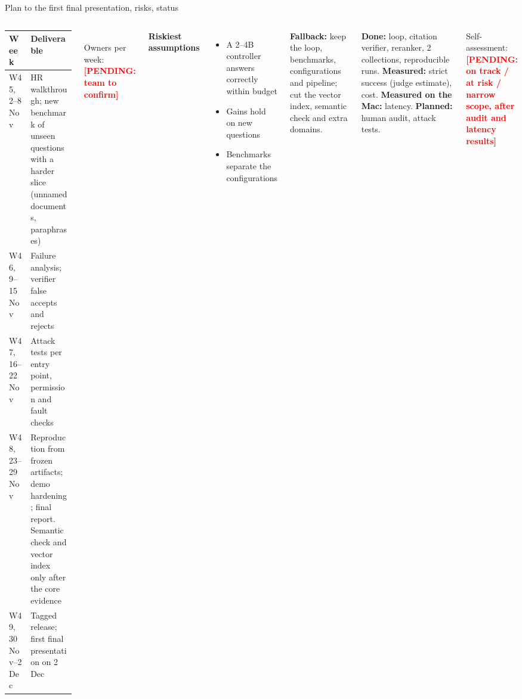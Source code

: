\documentclass[aspectratio=1610,11pt]{beamer}
\newcommand{\pend}[1]{\textcolor{red}{\textbf{[PENDING: #1]}}}
\begin{document}
\begin{frame}{Plan to the first final presentation, risks, status}
  \begin{columns}[T]
    \scriptsize
    \begin{tabularx}{\linewidth}{@{}>{\raggedright\arraybackslash}p{2.1cm}X@{}}
      \toprule Week & Deliverable\\\midrule
      W45, 2--8 Nov & HR walkthrough; new benchmark of unseen questions with a harder slice (unnamed documents, paraphrases)\\
      W46, 9--15 Nov & Failure analysis; verifier false accepts and rejects\\
      W47, 16--22 Nov & Attack tests per entry point, permission and fault checks\\
      W48, 23--29 Nov & Reproduction from frozen artifacts; demo hardening; final report. Semantic check and vector index only after the core evidence\\
      W49, 30 Nov--2 Dec & Tagged release; first final presentation on 2 Dec\\
      \bottomrule
    \end{tabularx}\\[3pt]
    \footnotesize Owners per week: \pend{team to confirm}

    \footnotesize
    \textbf{Riskiest assumptions}
    \begin{itemize}
      \item A 2--4B controller answers correctly within budget
      \item Gains hold on new questions
      \item Benchmarks separate the configurations
    \end{itemize}
    \textbf{Fallback:} keep the loop, benchmarks, configurations and pipeline; cut the vector index, semantic check and extra domains.
    \vspace{3pt}

    \textbf{Done:} loop, citation verifier, reranker, 2 collections, reproducible runs. \textbf{Measured:} strict success (judge estimate), cost. \textbf{Measured on the Mac:} latency. \textbf{Planned:} human audit, attack tests.
    \vspace{3pt}

    Self-assessment: \pend{on track / at risk / narrow scope, after audit and latency results}
  \end{columns}
\end{frame}
\end{document}
